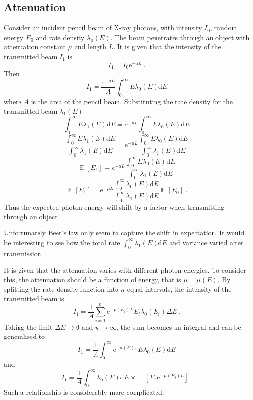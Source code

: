 \documentclass[12pt]{report}
\DeclareMathOperator{\expectation}{\mathbb{E}}
\newcommand{\euler}{\mathrm{e}}
\newcommand{\diff}{\mathrm{d}}
\begin{document}
\subsection{Attenuation}
Consider an incident pencil beam of X-ray photons, with intensity $I_0$, random energy $E_0$ and rate density $\lambda_0(E)$. The beam penetrates through an object with attenuation constant $\mu$ and length $L$. It is given that the intensity of the transmitted beam $I_1$ is
\begin{equation}
I_1 = I_0 \euler^{-\mu L} \ .
\end{equation}
Then
\begin{equation}
I_1 = \frac{\euler^{-\mu L}}{A}\int_{0}^{\infty}E\lambda_0(E)\diff E
\end{equation}
where $A$ is the area of the pencil beam. Substituting the rate density for the transmitted beam $\lambda_1(E)$
\begin{equation}
\int_{0}^{\infty}E\lambda_1(E)\diff E = \euler^{-\mu L}\int_{0}^{\infty}E\lambda_0(E)\diff E
\end{equation}
\begin{equation}
\frac{\int_{0}^{\infty}E\lambda_1(E)\diff E}{\int_{0}^{\infty}\lambda_1(E)\diff E}= \euler^{-\mu L}\frac{\int_{0}^{\infty}E\lambda_0(E)\diff E}{\int_{0}^{\infty}\lambda_1(E)\diff E}
\end{equation}
\begin{equation}
\expectation[E_1]= \euler^{-\mu L}\frac{\int_{0}^{\infty}E\lambda_0(E)\diff E}{\int_{0}^{\infty}\lambda_1(E)\diff E}
\end{equation}
\begin{equation}
\expectation[E_1]= \euler^{-\mu L}\frac{\int_{0}^{\infty}\lambda_0(E)\diff E}{\int_{0}^{\infty}\lambda_1(E)\diff E}\expectation[E_0] \ .
\end{equation}
Thus the expected photon energy will shift by a factor when transmitting through an object.

Unfortunately Beer's law only seem to capture the shift in expectation. It would be interesting to see how the total rate $\int_{0}^{\infty}\lambda_1(E)\diff E$ and variance varied after transmission.

It is given that the attenuation varies with different photon energies. To consider this, the attenuation should be a function of energy, that is $\mu=\mu(E)$. By splitting the rate density function into $n$ equal intervals, the intensity of the transmitted beam is
\begin{equation}
I_1=\frac{1}{A}\sum_{i=1}^n\euler^{-\mu(E_i)L}E_i\lambda_0(E_i)\Delta E \ .
\end{equation}
Taking the limit $\Delta E\rightarrow0$ and $n\rightarrow\infty$, the sum becomes an integral and can be generalised to
\begin{equation}
I_1=\frac{1}{A}\int_0^{\infty}\euler^{-\mu(E)L}E\lambda_0(E)\diff E
\end{equation}
and
\begin{equation}
I_1=\frac{1}{A}\int_0^{\infty}\lambda_0(E)\diff E \times \expectation\left[E_0\euler^{-\mu(E_0)L}\right] \ .
\end{equation}
Such a relationship is considerably more complicated.
\end{document}
